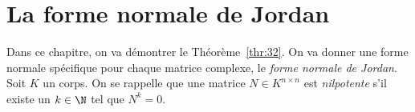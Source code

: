 
\chapter{La forme normale de Jordan}
\label{cha:la-forme-normale}




\noindent 
Dans ce chapitre, on va démontrer le Théorème~\ref{thr:32}.  On va donner une forme normale spécifique pour chaque matrice complexe, le \emph{forme normale de Jordan}.
Soit $K$ un corps. 
 On se rappelle que une  matrice $N ∈ K^{n ×n}$ est \emph{nilpotente} s'il existe un $k \in \N$ tel que $N^k = 0$. 





